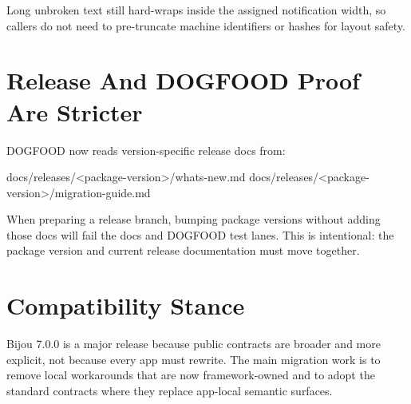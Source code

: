 Long unbroken text still hard-wraps inside the assigned notification width, so callers do not need to pre-truncate machine identifiers or hashes for layout safety.

\section{Release And DOGFOOD Proof Are Stricter}\label{record-270-release-and-dogfood-proof-are-stricter}

DOGFOOD now reads version-specific release docs from:

\begin{CodeBlock}
docs/releases/<package-version>/whats-new.md
docs/releases/<package-version>/migration-guide.md
\end{CodeBlock}

When preparing a release branch, bumping package versions without adding those docs will fail the docs and DOGFOOD test lanes. This is intentional: the package version and current release documentation must move together.

\section{Compatibility Stance}\label{record-270-compatibility-stance}

Bijou 7.0.0 is a major release because public contracts are broader and more explicit, not because every app must rewrite. The main migration work is to remove local workarounds that are now framework-owned and to adopt the standard contracts where they replace app-local semantic surfaces.

